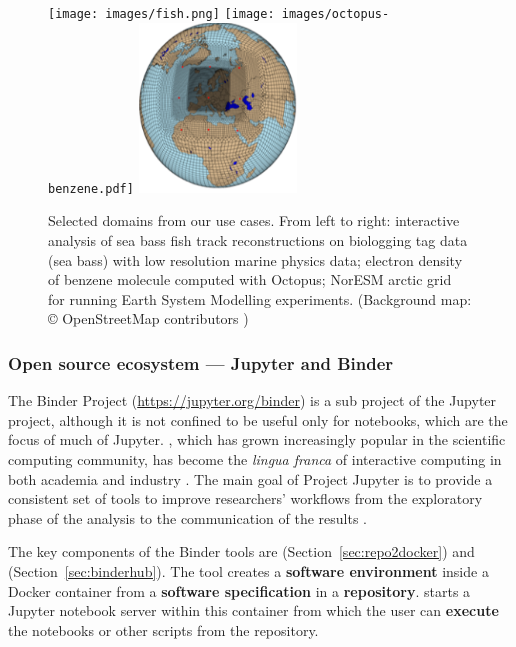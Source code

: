 \begin{figure}
  \texttt{[image: images/fish.png]}\hfill
  \texttt{[image: images/octopus-benzene.pdf]}\hfill\hspace{0.5cm}
  \includegraphics[height=4.5cm]{images/gg-a.png}
  \caption{Selected domains from our use cases. From left to right: interactive
    analysis of sea bass fish track reconstructions on biologging tag data (sea bass)
    with low resolution marine physics data; electron
    density of benzene molecule computed with Octopus; NorESM arctic grid for running Earth System Modelling experiments.
    (Background map: \copyright
    OpenStreetMap contributors ) \label{fig:applications}}
\end{figure}

\subsubsection{Open source ecosystem --- Jupyter and Binder}\label{sec:opensource}

The Binder Project \cite{binder} (\url{https://jupyter.org/binder}) is
a sub project of the Jupyter project, although it is not confined to be
useful only for notebooks, which are the focus of much of Jupyter.
 \cite{Jupyter}, which has grown increasingly popular in the scientific
computing community, has become the \emph{lingua franca} of interactive
computing in both academia and industry \cite{Perkel2018}. The main goal of Project Jupyter
is to provide a consistent set of tools to improve researchers'
workflows from the exploratory phase of the analysis to the communication
of the results \cite{Kluyver2016,Granger2021}.

The key components of the Binder tools are \repotodocker{}
(Section~\ref{sec:repo2docker}) and \binderhub{} (Section~\ref{sec:binderhub}). The \repotodocker{} tool
creates a \textbf{software environment} inside a Docker container from a \textbf{software
specification} in a \textbf{repository}. \binderhub{} starts a Jupyter notebook server
within this container from which the user can \textbf{execute} the notebooks or other scripts from the
repository.

